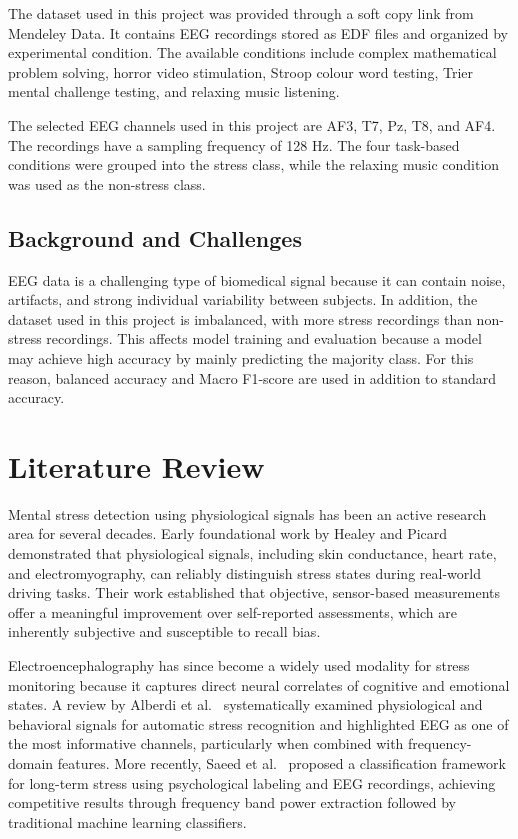 \documentclass[12pt,a4paper]{article}
\begin{document}
	The dataset used in this project was provided through a soft copy link from Mendeley Data. It contains EEG recordings stored as EDF files and organized by experimental condition. The available conditions include complex mathematical problem solving, horror video stimulation, Stroop colour word testing, Trier mental challenge testing, and relaxing music listening.
	
	The selected EEG channels used in this project are AF3, T7, Pz, T8, and AF4. The recordings have a sampling frequency of 128 Hz. The four task-based conditions were grouped into the stress class, while the relaxing music condition was used as the non-stress class.
	
	\subsection{Background and Challenges}
	
	EEG data is a challenging type of biomedical signal because it can contain noise, artifacts, and strong individual variability between subjects. In addition, the dataset used in this project is imbalanced, with more stress recordings than non-stress recordings. This affects model training and evaluation because a model may achieve high accuracy by mainly predicting the majority class. For this reason, balanced accuracy and Macro F1-score are used in addition to standard accuracy.
	
	\section{Literature Review}

	Mental stress detection using physiological signals has been an active research area for several decades. Early foundational work by Healey and Picard \cite{healey2005} demonstrated that physiological signals, including skin conductance, heart rate, and electromyography, can reliably distinguish stress states during real-world driving tasks. Their work established that objective, sensor-based measurements offer a meaningful improvement over self-reported assessments, which are inherently subjective and susceptible to recall bias.

	Electroencephalography has since become a widely used modality for stress monitoring because it captures direct neural correlates of cognitive and emotional states. A review by Alberdi et al.~\cite{alberdi2016} systematically examined physiological and behavioral signals for automatic stress recognition and highlighted EEG as one of the most informative channels, particularly when combined with frequency-domain features. More recently, Saeed et al.~\cite{saeed2020} proposed a classification framework for long-term stress using psychological labeling and EEG recordings, achieving competitive results through frequency band power extraction followed by traditional machine learning classifiers.
\end{document}
